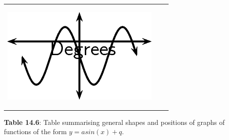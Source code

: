 \begin{center}
\begin{xtabular*}{\mytablewidth}[t]{|p{10\mystarwidth}|p{10\mystarwidth}|p{10\mystarwidth}|}
        
                  
    \setcounter{subfigure}{0}

\label{m39414*id85433}
    \begin{center}
    \label{m39414*id85433!!!underscore!!!media}\label{m39414*id85433!!!underscore!!!printimage}\includegraphics{col11306.imgs/m39414_MG10C15_022.png} %
        
      \vspace{2pt}
    \vspace{.1in}
    
    \end{center}



    \addtocounter{footnote}{-0}
    
     \tabularnewline{}
    \end{xtabular*}
      \end{center}
    \begin{center}{\small\bfseries Table 14.6}: Table summarising general shapes and positions of graphs of functions of the form \begin{math}y=asin\left(x\right)+q\end{math}.\end{center}
    
    \addtocounter{footnote}{-0}
    
    \par
  

        \label{m39414*uid47}
            \nopagebreak
            
